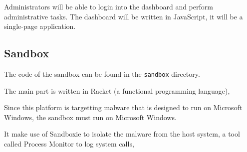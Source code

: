 Administrators will be able to login into the dashboard and perform administrative tasks.
The dashboard will be written in JavaScript, it will be a single-page application.



\subsection{Sandbox}
The code of the sandbox can be found in the \texttt{sandbox} directory.

The main part is written in Racket (a functional programming language),


Since this platform is targetting malware that is designed to run on Microsoft Windows,
the sandbox must run on Microsoft Windows.

It make use of Sandboxie to isolate the malware from the host system,
a tool called Process Monitor to log system calls,









